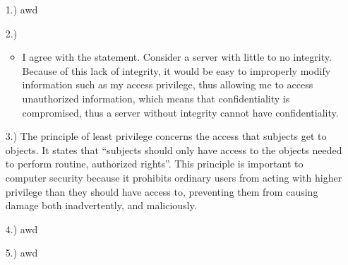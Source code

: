\documentclass[11pt]{article}
\begin{document}
\pagestyle{fancy}
\fancyhead{}

\normalsize

\begin{itemize}
    \item [1.)] awd

    \item [2.)] \begin{itemize}
        \item I agree with the statement. Consider a server with little to no integrity. Because of this lack of integrity, it would be easy to improperly modify information such as my access privilege, thus allowing me to access unauthorized information, which means that confidentiality is compromised, thus a server without integrity cannot have confidentiality.
    \end{itemize}

    \item [3.)] The principle of least privilege concerns the access that subjects get to objects. It states that ``subjects should only have access to the objects needed to perform routine, authorized rights''. This principle is important to computer security because it prohibits ordinary users from acting with higher privilege than they should have access to, preventing them from causing damage both inadvertently, and maliciously.

    \item [4.)] awd

    \item [5.)] awd
\end{itemize}
\end{document}
